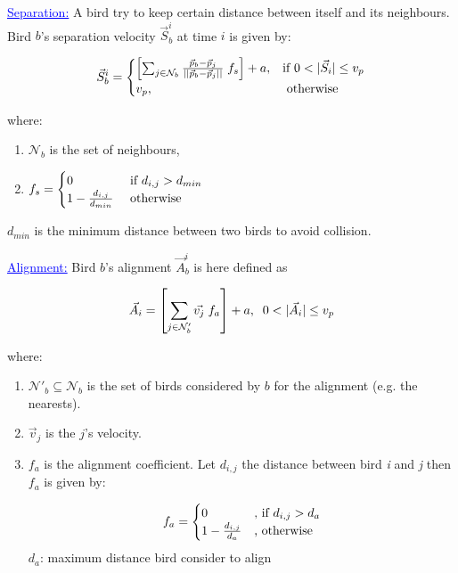 \documentclass{beamer}
\begin{document}
\begin{frame}
\textcolor{blue}{\underline{Separation:}}
A bird try to keep certain distance between itself and
its neighbours. Bird $b$'s separation velocity $\vec{S}_b^i$ at time $i$ is given
by:


\begin{equation}
\vec{S}_b^i = 
	\begin{cases}
	 \left[\sum_{j \in \mathcal{N}_b}{\frac{\vec{p}_b -
\vec{p}_j}{||\vec{p}_b - \vec{p}_j||}} \;f_s\right] + a ,&\mbox{if } 0 < |\vec{S}_i|
\leq v_p\\
		v_p, &\mbox{ otherwise }  \notag
	\end{cases}
\end{equation}

where:

\begin{enumerate}
\item \(\mathcal{N}_b\) is the set of neighbours, %
\item $
	f_s = \begin{cases}
	0 &\mbox{ if }  d_{i,j} > d_{min}\\
	1 - \frac{d_{i,j}}{d_{min}} &\mbox{ otherwise} \notag
	\end{cases}$
\end{enumerate}

$d_{min}$ is the minimum distance between two birds to avoid collision.
\end{frame}

\begin{frame}
\textcolor{blue}{\underline{Alignment:}}
Bird $b$'s alignment \(\vec{A}_b^i\) is here defined as %

\begin{align}
  \vec{A}_i = \left[\sum_{j \in \mathcal{N}'_b}{\vec{v_j}}\;f_a\right] + a, \;\;0 < |\vec{A}_i| \leq v_p \notag
  \label{eq:alignment}
\end{align}

where:

\begin{enumerate}
\item \(\mathcal{N}'_b \subseteq \mathcal{N}_b\) is the set of birds considered by $b$ for the alignment (e.g. the nearests).
\item \(\vec{v}_j\) is the $j$'s velocity.
\item \(f_a\) is the alignment coefficient. Let \(d_{i,j}\) the distance between bird \emph{i} and \emph{j} then \(f_a\) is given by:

\begin{equation*}
	f_a = \begin{cases}
	0 &\text{, if $ d_{i,j} > d_a$}\\
	1- \frac{d_{i,j}}{d_a} &\text{, otherwise} \notag
	\end{cases}
\end{equation*}
$d_a$: maximum distance bird consider to align 
\end{enumerate}
\end{frame}
\end{document}

